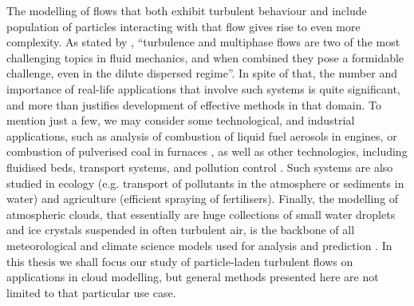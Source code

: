 \documentclass{pracamgren}
\begin{document}
The modelling of flows that both exhibit turbulent behaviour and include population of particles interacting with that flow gives rise to even more complexity.
As stated by \textcite{Balachandar2010}, ``turbulence and multiphase flows are two of the most challenging topics in fluid mechanics, and when combined they pose a formidable challenge, even in the dilute dispersed regime''.
In spite of that, the number and importance of real-life applications that involve such systems is quite significant, and more than justifies development of effective methods in that domain.
To mention just a few, we may consider some technological, and industrial applications, such as analysis of combustion of liquid fuel aerosols in engines, or combustion of pulverised coal in furnaces \parencite{Zheng2020}, as well as other technologies, including fluidised beds, transport systems, and pollution control \parencite[4-17]{Crowe2012}.
Such systems are also studied in ecology (e.g. transport of pollutants in the atmosphere or sediments in water) and agriculture (efficient spraying of fertilisers).
Finally, the modelling of atmospheric clouds, that essentially are huge collections of small water droplets and ice crystals suspended in often turbulent air, is the backbone of all meteorological and climate science models used for analysis and prediction \parencite{Devenish2012, Grabowski2013}.
In this thesis we shall focus our study of particle-laden turbulent flows on applications in cloud modelling, but general methods presented here are not limited to that particular use case.
\end{document}

